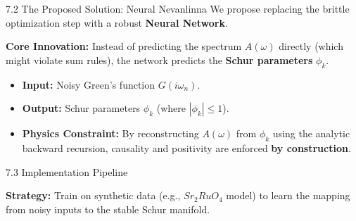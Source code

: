 \documentclass[aspectratio=169, 11pt]{beamer}
\begin{document}
\begin{frame}{7.2 The Proposed Solution: Neural Nevanlinna}
    We propose replacing the brittle optimization step with a robust \textbf{Neural Network}.
    
    \textbf{Core Innovation:}
    Instead of predicting the spectrum $A(\omega)$ directly (which might violate sum rules), the network predicts the \textbf{Schur parameters} $\phi_k$.
    
    \begin{itemize}
        \item \textbf{Input:} Noisy Green's function $G(i\omega_n)$.
        \item \textbf{Output:} Schur parameters $\phi_k$ (where $|\phi_k| \le 1$).
        \item \textbf{Physics Constraint:} By reconstructing $A(\omega)$ from $\phi_k$ using the analytic backward recursion, causality and positivity are enforced \textbf{by construction}.
    \end{itemize}
\end{frame}

\begin{frame}{7.3 Implementation Pipeline}
    \centering
    
    \vspace{0.2cm}
    \textbf{Strategy:} Train on synthetic data (e.g., $Sr_2RuO_4$ model) to learn the mapping from noisy inputs to the stable Schur manifold.
\end{frame}
\end{document}
